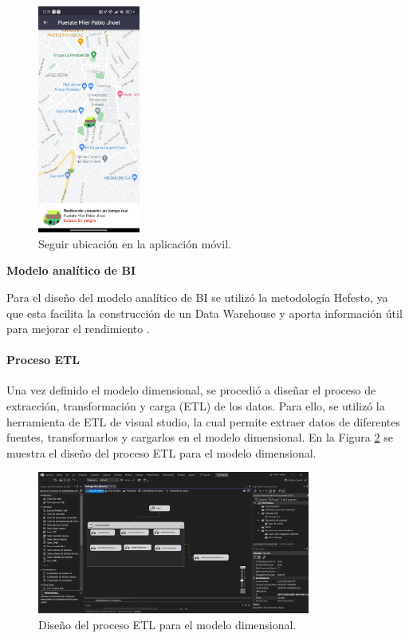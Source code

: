 \begin{figure}[H]
    \centering
    \includegraphics[width=0.3\textwidth]{chapters/III-resultados-y-discusion/resources/images/seguir-ubicacion-movil.png}
    \caption{Seguir ubicación en la aplicación móvil.}
    \label{fig:seguir-ubicacion-movil}
\end{figure}

\textbf{Modelo analítico de BI}
\bigbreak

Para el diseño del modelo analítico de BI se utilizó la metodología Hefesto, ya que esta facilita la construcción de un
Data Warehouse y aporta información útil para mejorar el rendimiento \cite{darioDATAWAREHOUSINGMarco2018}.



\paragraph{Proceso ETL}

Una vez definido el modelo dimensional, se procedió a diseñar el proceso de extracción, transformación y carga (ETL) de los datos.
Para ello, se utilizó la herramienta de ETL de visual studio, la cual permite extraer datos de diferentes fuentes, transformarlos
y cargarlos en el modelo dimensional. En la Figura \ref{fig:etl-bi} se muestra el diseño del proceso ETL para el modelo dimensional.

\begin{figure}[H]
    \centering
    \includegraphics[width=0.8\textwidth]{chapters/III-resultados-y-discusion/resources/images/etl-bi.png}
    \caption{Diseño del proceso ETL para el modelo dimensional.}
    \label{fig:etl-bi}
\end{figure}

